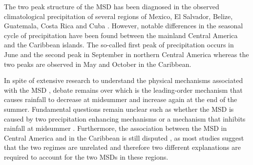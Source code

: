 The two peak structure of the MSD has been diagnosed in the observed climatological precipitation of several regions of Mexico, El Salvador, Belize, Guatemala, Costa Rica and Cuba \citep[e.g.][]{mosino1966,magana1999,duranquesada2017,perdigon2018,martinez2019}.
However, notable differences in the seasonal cycle of precipitation have been found between the mainland Central America and the Caribbean islands. The so-called first peak of precipitation occurs in June and the second peak in September in northern Central America whereas the two peaks are observed in May and October in the Caribbean.

 In spite of extensive research to understand the physical mechanisms associated with the MSD   \citep[e.g.][]{magana1999,giannini2000,gamble2008,herrera2015,maldonado2017,straffon2019}, debate remains over which is the leading-order mechanism that causes rainfall to decrease at midsummer and increase again at the end of the summer.  %
Fundamental questions remain unclear such  as whether the MSD is caused by two precipitation enhancing mechanisms \citep{karnauskas2013} or a mechanism that inhibits rainfall at midsummer \citep{duranquesada2017}. 
Furthermore, the association between the MSD in Central America and in the Caribbean is still disputed \citep{gamble2008}, as most studies suggest that the two regimes are unrelated and therefore two different explanations are required to account for the two MSDs in these regions. 


